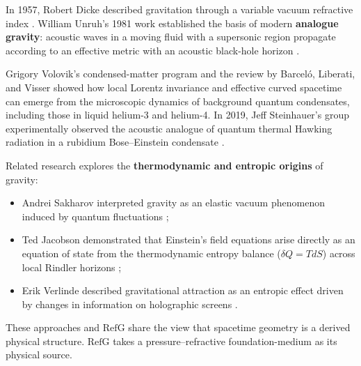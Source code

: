\documentclass[11pt,a4paper]{article}
\newcommand{\RefG}{\mathrm{RefG}}
\begin{document}
In 1957, Robert Dicke described gravitation through a variable vacuum refractive index \citep{dicke1957}. William Unruh's 1981 work established the basis of modern \textbf{analogue gravity}: acoustic waves in a moving fluid with a supersonic region propagate according to an effective metric with an acoustic black-hole horizon \citep{unruh1981}.

Grigory Volovik's condensed-matter program \citep{volovik2003} and the review by Barceló, Liberati, and Visser \citep{barcelo2011} showed how local Lorentz invariance and effective curved spacetime can emerge from the microscopic dynamics of background quantum condensates, including those in liquid helium-3 and helium-4. In 2019, Jeff Steinhauer's group experimentally observed the acoustic analogue of quantum thermal Hawking radiation in a rubidium Bose--Einstein condensate \citep{munozdenova2019}.

Related research explores the \textbf{thermodynamic and entropic origins} of gravity:
\begin{itemize}
\item Andrei Sakharov interpreted gravity as an elastic vacuum phenomenon induced by quantum fluctuations \citep{sakharov1967};
\item Ted Jacobson demonstrated that Einstein's field equations arise directly as an equation of state from the thermodynamic entropy balance ($\delta Q = T dS$) across local Rindler horizons \citep{jacobson1995};
\item Erik Verlinde described gravitational attraction as an entropic effect driven by changes in information on holographic screens \citep{verlinde2011}.
\end{itemize}

These approaches and $\RefG$ share the view that spacetime geometry is a derived physical structure. $\RefG$ takes a pressure--refractive foundation-medium as its physical source.
\end{document}
